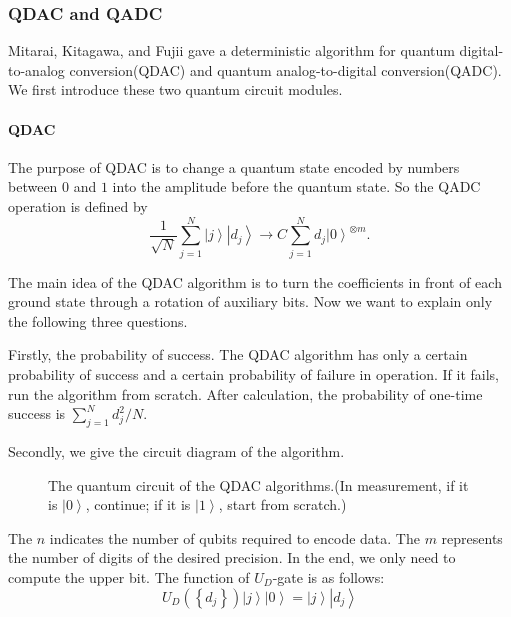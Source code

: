 \documentclass[%
 reprint,
 amsmath,amssymb,
pra,
]{revtex4-1}
\begin{document}
\subsubsection{QDAC and QADC}
Mitarai, Kitagawa, and Fujii \cite{mitarai2019quantum} gave a deterministic algorithm for quantum digital-to-analog conversion(QDAC) and quantum analog-to-digital conversion(QADC). We first introduce these two quantum circuit modules.
\paragraph{QDAC}

The purpose of QDAC is to change a quantum state encoded by numbers between $0$ and $1$ into the amplitude before the quantum state. So the QADC operation is defined by
\[\frac{1}{{\sqrt N }}\sum\limits_{j = 1}^N {\left| j \right\rangle \left| {{d_j}} \right\rangle  \to C\sum\limits_{j = 1}^N {{d_j}{{\left| 0 \right\rangle }^{ \otimes m}}} }. \]

The main idea of the QDAC algorithm is to turn the coefficients in front of each ground state through a rotation of auxiliary bits. Now we want to explain only the following three questions.

Firstly, the probability of success. The QDAC algorithm has only a certain probability of success and a certain probability of failure in operation. If it fails, run the algorithm from scratch. After calculation, the probability of one-time success is $\sum\nolimits_{j = 1}^N {d_j^2/N} $\cite{mitarai2019quantum}.

Secondly, we give the circuit diagram of the algorithm.

\begin{figure}[htbp]
  \caption{The quantum circuit of the QDAC algorithms.(In measurement, if it is $\left| 0 \right\rangle $, continue; if it is $\left| 1 \right\rangle $, start from scratch.)}
 \label{QDAC_qcir}
\end{figure}

The $n$ indicates the number of qubits required to encode data. The $m$ represents the number of digits of the desired precision. In the end, we only need to compute the upper bit. The function of ${U_D}$-gate is as follows:
\[{U_D}\left( {\left\{ {{d_j}} \right\}} \right)\left| j \right\rangle \left| 0 \right\rangle  = \left| j \right\rangle \left| {{d_j}} \right\rangle \]
\end{document}
